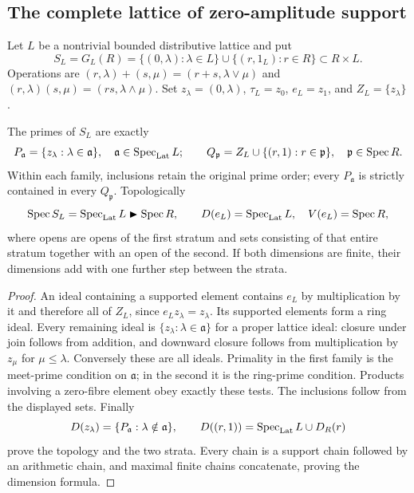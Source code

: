 \subsection{The complete lattice of zero-amplitude support}
Let $L$ be a nontrivial bounded distributive lattice and put
\[
 S_L=G_L(R)=\{(0,\lambda):\lambda\in L\}\cup\{(r,1_L):r\in R\}
 \subset R\times L.
\]
Operations are $(r,\lambda)+(s,\mu)=(r+s,\lambda\vee\mu)$ and
$(r,\lambda)(s,\mu)=(rs,\lambda\wedge\mu)$. Set $z_\lambda=(0,\lambda)$, $\tau_L=z_0$, $e_L=z_1$, and $Z_L=\{z_\lambda\}$.
\begin{theorem}\label{thm:rebuilt-full-support}
The primes of $S_L$ are exactly
\[
 P_{\mathfrak a}=\{z_\lambda:\lambda\in\mathfrak a\},\quad\mathfrak a\in\operatorname{Spec}_{\rm Lat} L;
 \qquad Q_{\mathfrak p}=Z_L\cup\{(r,1):r\in\mathfrak p\},\quad\mathfrak p\in\operatorname{Spec} R.
\]
Within each family, inclusions retain the original prime order; every $P_{\mathfrak a}$ is strictly contained in every $Q_{\mathfrak p}$. Topologically
\begin{equation}\label{eq:full-spectral-base}
 \operatorname{Spec} S_L=\operatorname{Spec}_{\rm Lat} L\blacktriangleright\operatorname{Spec} R,
 \qquad D(e_L)=\operatorname{Spec}_{\rm Lat} L,\quad V(e_L)=\operatorname{Spec} R,
\end{equation}
where opens are opens of the first stratum and sets consisting of that entire stratum together with an open of the second. If both dimensions are finite, their dimensions add with one further step between the strata.
\end{theorem}
\begin{proof}
An ideal containing a supported element contains $e_L$ by multiplication by it and therefore all of $Z_L$, since $e_Lz_\lambda=z_\lambda$. Its supported elements form a ring ideal. Every remaining ideal is $\{z_\lambda:\lambda\in\mathfrak a\}$ for a proper lattice ideal: closure under join follows from addition, and downward closure follows from multiplication by $z_\mu$ for $\mu\le\lambda$. Conversely these are all ideals. Primality in the first family is the meet-prime condition on $\mathfrak a$; in the second it is the ring-prime condition. Products involving a zero-fibre element obey exactly these tests. The inclusions follow from the displayed sets. Finally
\[
 D(z_\lambda)=\{P_{\mathfrak a}:\lambda\notin\mathfrak a\},\qquad
 D((r,1))=\operatorname{Spec}_{\rm Lat} L\cup D_R(r)
\]
prove the topology and the two strata. Every chain is a support chain followed by an arithmetic chain, and maximal finite chains concatenate, proving the dimension formula.
\end{proof}

